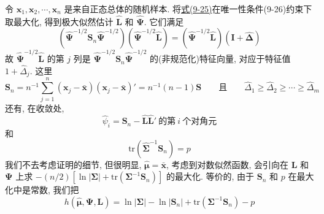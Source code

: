  \quad 令 $\mathbf{x}_1,\mathbf{x}_2,\cdots,\mathbf{x}_n$ 是来自正态总体的随机样本. 将\hyperref[eq:9-25]{式(9-25)}在唯一性条件(9-26)约束下取最大化, 得到极大似然估计 $\hat{\mathbf{L}}$ 和 $\hat{\boldsymbol{\Psi}}$. 它们满足
\label{eq:9A-1}
\begin{equation}
(\hat{\boldsymbol{\Psi}}^{-1/2}\mathbf{S}_n\hat{\boldsymbol{\Psi}}^{-1/2})(\hat{\boldsymbol{\Psi}}^{-1/2}\hat{\mathbf{L}})=(\hat{\boldsymbol{\Psi}}^{-1/2}\hat{\mathbf{L}})(\mathbf{I}+\hat{\boldsymbol{\Delta}}) \tag{9A-1}
\end{equation}
故 $\hat{\boldsymbol{\Psi}}^{-1/2}\hat{\mathbf{L}}$ 的第 $j$ 列是 $\hat{\boldsymbol{\Psi}}^{-1/2}\mathbf{S}_n\hat{\boldsymbol{\Psi}}^{-1/2}$ 的(非规范化)特征向量, 对应于特征值 $1+\hat{\Delta}_j$. 这里
\[
\mathbf{S}_n=n^{-1}\sum_{j=1}^{n}(\mathbf{x}_j-\bar{\mathbf{x}})(\mathbf{x}_j-\bar{\mathbf{x}})'=n^{-1}(n-1)\mathbf{S}\qquad\text{且}\qquad
\hat{\Delta}_1\geqslant\hat{\Delta}_2\geqslant\cdots\geqslant\hat{\Delta}_m
\]
还有, 在收敛处,
\label{eq:9A-2}
\begin{equation}
\hat{\psi}_i=\mathbf{S}_n-\hat{\mathbf{L}}\hat{\mathbf{L}}'\ \text{的第}\ i\ \text{个对角元} \tag{9A-2}
\end{equation}
和
\[
\mathrm{tr}(\hat{\boldsymbol{\Sigma}}^{-1}\mathbf{S}_n)=p
\]
我们不去考虑证明的细节, 但很明显, $\hat{\boldsymbol{\mu}}=\bar{\mathbf{x}}$, 考虑到对数似然函数, 会引向在 $\mathbf{L}$ 和 $\boldsymbol{\Psi}$ 上求 $-(n/2)[\ln|\boldsymbol{\Sigma}|+\mathrm{tr}(\boldsymbol{\Sigma}^{-1}\mathbf{S}_n)]$ 的最大化. 等价的, 由于 $\mathbf{S}_n$ 和 $p$ 在最大化中是常数, 我们把
\label{eq:9A-3}
\begin{equation}
h(\hat{\boldsymbol{\mu}},\boldsymbol{\Psi},\mathbf{L})=\ln|\boldsymbol{\Sigma}|-\ln|\mathbf{S}_n|+\mathrm{tr}(\boldsymbol{\Sigma}^{-1}\mathbf{S}_n)-p \tag{9A-3}
\end{equation}
